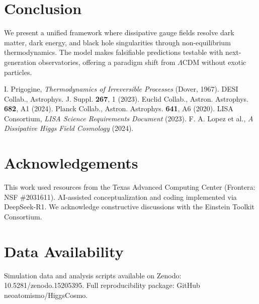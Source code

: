 \documentclass[12pt, a4paper]{article}
\begin{document}
\section{Conclusion}
We present a unified framework where dissipative gauge fields resolve dark matter, dark energy, and black hole singularities through non-equilibrium thermodynamics. The model makes falsifiable predictions testable with next-generation observatories, offering a paradigm shift from $\Lambda$CDM without exotic particles.

\begin{thebibliography}{9}
 I. Prigogine, \textit{Thermodynamics of Irreversible Processes} (Dover, 1967).
 DESI Collab., Astrophys. J. Suppl. \textbf{267}, 1 (2023).
 Euclid Collab., Astron. Astrophys. \textbf{682}, A1 (2024).
 Planck Collab., Astron. Astrophys. \textbf{641}, A6 (2020).
 LISA Consortium, \textit{LISA Science Requirements Document} (2023).
 F. A. Lopez et al., \textit{A Dissipative Higgs Field Cosmology} (2024).
\end{thebibliography}

\section*{Acknowledgements}
This work used resources from the Texas Advanced Computing Center (Frontera: NSF \#2031611). AI-assisted conceptualization and coding implemented via DeepSeek-R1. We acknowledge constructive discussions with the Einstein Toolkit Consortium.

\section*{Data Availability}
Simulation data and analysis scripts available on Zenodo: 10.5281/zenodo.15205395. Full reproducibility package: GitHub neoatomismo/HiggsCosmo.
\end{document}
